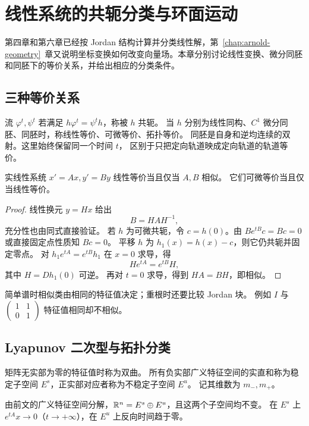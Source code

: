 \chapter{线性系统的共轭分类与环面运动}\label{chap:linear-conjugacy}

第四章和第六章已经按 Jordan 结构计算并分类线性解，第~\ref{chap:arnold-geometry}~章又说明坐标变换如何改变向量场。本章分别讨论线性变换、微分同胚和同胚下的等价关系，并给出相应的分类条件。

\section{三种等价关系}
\begin{definition}
流 $\varphi^t,\psi^t$ 若满足
$h\varphi^t=\psi^th$，称被 $h$ 共轭。
当 $h$ 分别为线性同构、$C^1$ 微分同胚、同胚时，称线性等价、可微等价、拓扑等价。
同胚是自身和逆均连续的双射。这里始终保留同一个时间 $t$，
区别于只把定向轨道映成定向轨道的轨道等价。
\end{definition}
\begin{theorem}
实线性系统 $x'=Ax,y'=By$ 线性等价当且仅当 $A,B$ 相似。
它们可微等价当且仅当线性等价。
\end{theorem}
\begin{proof}
线性换元 $y=Hx$ 给出 
\[
 B=HAH^{-1},
\]
充分性也由同式直接验证。
若 $h$ 为可微共轭，令 $c=h(0)$。由 $Be^{tB}c=Bc=0$ 或直接固定点性质知 $Bc=0$。
平移 $h$ 为 $h_1(x)=h(x)-c$，则它仍共轭并固定零点。
对 $h_1e^{tA}=e^{tB}h_1$ 在 $x=0$ 求导，得
\[
 He^{tA}=e^{tB}H,
\]
其中 $H=Dh_1(0)$ 可逆。
再对 $t=0$ 求导，得到 $HA=BH$，即相似。
\end{proof}
简单谱时相似类由相同的特征值决定；重根时还要比较 Jordan 块。
例如 $I$ 与 $\left(\begin{smallmatrix}1&1\\0&1\end{smallmatrix}\right)$ 特征值相同却不相似。

\section{Lyapunov 二次型与拓扑分类}
\begin{definition}
矩阵无实部为零的特征值时称为双曲。
所有负实部广义特征空间的实直和称为稳定子空间 $E^s$，正实部对应者称为不稳定子空间 $E^u$。
记其维数为 $m_-,m_+$。
\end{definition}
由前文的广义特征空间分解，$\mathbb{R}^n=E^s\oplus E^u$，且这两个子空间均不变。
在 $E^s$ 上 $e^{tA}x\to0$（$t\to+\infty$），在 $E^u$ 上反向时间趋于零。

